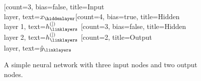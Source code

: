 \newcommand{\neuralx}[2]{\(x_#2\)}
\newcommand{\neuraly}[2]{\(\hat{y}_#2\)}
\newcommand{\neuralh}[2]{\small \(h^{(#1)}_#2\)}
\begin{figure}[ht]
  \centering
  \caption[An example of a neural network]{A simple neural network with three input nodes and two output nodes.}
  \begin{neuralnetwork}[height=5]
    [count=3, bias=false, title=Input\\layer, text=\neuralx]
    \hiddenlayer[count=4, bias=true, title=Hidden\\layer 1, text=\neuralh] \linklayers{}
    \hiddenlayer[count=3, bias=false, title=Hidden\\layer 2, text=\neuralh] \linklayers{}
    \outputlayer[count=2, title=Output\\layer, text=\neuraly] \linklayers{}
  \end{neuralnetwork}\label{fig:neural_network}
\end{figure}